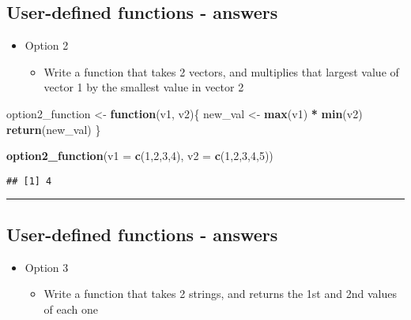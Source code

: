 \documentclass[]{article}
\newenvironment{Shaded}{\begin{snugshade}}{\end{snugshade}}
\newcommand{\ControlFlowTok}[1]{\textcolor[rgb]{0.13,0.29,0.53}{\textbf{#1}}}
\newcommand{\DataTypeTok}[1]{\textcolor[rgb]{0.13,0.29,0.53}{#1}}
\newcommand{\DecValTok}[1]{\textcolor[rgb]{0.00,0.00,0.81}{#1}}
\newcommand{\KeywordTok}[1]{\textcolor[rgb]{0.13,0.29,0.53}{\textbf{#1}}}
\newcommand{\NormalTok}[1]{#1}
\newcommand{\OperatorTok}[1]{\textcolor[rgb]{0.81,0.36,0.00}{\textbf{#1}}}
\newcommand{\StringTok}[1]{\textcolor[rgb]{0.31,0.60,0.02}{#1}}
\providecommand{\tightlist}{%
  \setlength{\itemsep}{0pt}\setlength{\parskip}{0pt}}
\begin{document}
\hypertarget{user-defined-functions---answers-1}{%
\subsection{User-defined functions -
answers}\label{user-defined-functions---answers-1}}

\begin{itemize}
\tightlist
\item
  Option 2

  \begin{itemize}
  \tightlist
  \item
    Write a function that takes 2 vectors, and multiplies that largest
    value of vector 1 by the smallest value in vector 2
  \end{itemize}
\end{itemize}

\begin{Shaded}
\begin{Highlighting}[]
\NormalTok{option2_function <-}\StringTok{ }\ControlFlowTok{function}\NormalTok{(v1, v2)\{}
\NormalTok{  new_val <-}\StringTok{ }\KeywordTok{max}\NormalTok{(v1) }\OperatorTok{*}\StringTok{ }\KeywordTok{min}\NormalTok{(v2)}
  \KeywordTok{return}\NormalTok{(new_val)}
\NormalTok{\}}

\KeywordTok{option2_function}\NormalTok{(}\DataTypeTok{v1 =} \KeywordTok{c}\NormalTok{(}\DecValTok{1}\NormalTok{,}\DecValTok{2}\NormalTok{,}\DecValTok{3}\NormalTok{,}\DecValTok{4}\NormalTok{), }\DataTypeTok{v2 =} \KeywordTok{c}\NormalTok{(}\DecValTok{1}\NormalTok{,}\DecValTok{2}\NormalTok{,}\DecValTok{3}\NormalTok{,}\DecValTok{4}\NormalTok{,}\DecValTok{5}\NormalTok{))}
\end{Highlighting}
\end{Shaded}

\begin{verbatim}
## [1] 4
\end{verbatim}

\begin{center}\rule{0.5\linewidth}{\linethickness}\end{center}

\hypertarget{user-defined-functions---answers-2}{%
\subsection{User-defined functions -
answers}\label{user-defined-functions---answers-2}}

\begin{itemize}
\tightlist
\item
  Option 3

  \begin{itemize}
  \tightlist
  \item
    Write a function that takes 2 strings, and returns the 1st and 2nd
    values of each one
  \end{itemize}
\end{itemize}
\end{document}

